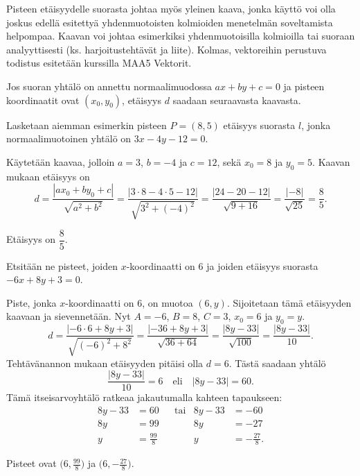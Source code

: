 Pisteen etäisyydelle suorasta johtaa myös yleinen kaava, jonka käyttö voi olla joskus edellä esitettyä yhdenmuotoisten kolmioiden menetelmän soveltamista helpompaa. Kaavan voi johtaa esimerkiksi yhdenmuotoisilla kolmioilla tai suoraan analyyttisesti (ks. harjoitustehtävät ja liite). Kolmas, vektoreihin perustuva todistus esitetään kurssilla MAA5 Vektorit.

Jos suoran yhtälö on annettu normaalimuodossa $ax+by+c=0$ ja pisteen koordinaatit ovat $(x_0, y_0)$, etäisyys $d$ saadaan seuraavasta kaavasta.


\begin{esimerkki} Lasketaan aiemman esimerkin pisteen $P=(8, 5)$ etäisyys suorasta $l$, jonka normaalimuotoinen yhtälö on $3x-4y-12=0$.
\begin{esimratk}
Käytetään kaavaa, jolloin $a=3$, $b=-4$ ja $c=12$, sekä $x_0=8$ ja $y_0=5$. Kaavan mukaan etäisyys on
\[
d=\frac{|ax_0+by_0+c|}{\sqrt{a^2+b^2}}
=\frac{|3\cdot 8-4\cdot 5-12|}{\sqrt{3^2+(-4)^2}}
=\frac{|24-20-12|}{\sqrt{9+16}}=\frac{|-8|}{\sqrt{25}}
=\frac{8}{5}.
\]
\end{esimratk}
\begin{esimvast}
Etäisyys on $\dfrac{8}{5}$.
\end{esimvast}
\end{esimerkki}

\begin{esimerkki} Etsitään ne pisteet, joiden $x$-koordinaatti on 6 ja joiden etäisyys suorasta $-6x+8y+3=0$.
\begin{esimratk}
Piste, jonka $x$-koordinaatti on 6, on muotoa $(6, y)$. Sijoitetaan tämä etäisyyden kaavaan ja sievennetään.
Nyt $A=-6$, $B=8$, $C=3$, $x_0=6$ ja $y_0=y$.
\[
d=\frac{|-6\cdot 6+8y+3|}{\sqrt{(-6)^2+8^2}}
=\frac{|-36+8y+3|}{\sqrt{36+64}}
=\frac{|8y-33|}{\sqrt{100}}
=\frac{|8y-33|}{10}.
\]
Tehtävänannon mukaan etäisyyden pitäisi olla $d=6$. Tästä saadaan yhtälö
\[
\frac{|8y-33|}{10}=6 \quad \text{eli} \quad |8y-33|=60.
\]
Tämä itseisarvoyhtälö ratkeaa jakautumalla kahteen tapaukseen:
\begin{align*}
8y-33 & =60 & &\text{tai} & 8y-33 & =-60 \\
8y & =99 & & & 8y & =-27 \\
y & =\frac{99}{8} & & & y & =-\frac{27}{8}.
\end{align*}
\end{esimratk}
\begin{esimvast}
Pisteet ovat $\bigl(6, \frac{99}{8}\bigr)$ ja $\bigl(6, -\frac{27}{8}\bigr)$.
\end{esimvast}
\end{esimerkki}


